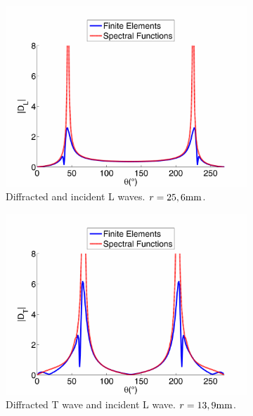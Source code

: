 \begin{figure}%
\centering
    \begin{subfigure}[b]{0.44\textwidth}
        \includegraphics[width=\textwidth]{images/chapter3/Figure11a.pdf}
        \caption{Diffracted and incident L waves. $r=25,6 \rm mm$.}
        \label{DLL}
    \end{subfigure}  
    \begin{subfigure}[b]{0.44\textwidth}
        \includegraphics[width=\textwidth]{images/chapter3/Figure11b.pdf}
        \caption{Diffracted T wave and incident L wave. $r=13,9 \rm mm$.}
        \label{DLT}
     \end{subfigure}   
     \begin{subfigure}[b]{0.44\textwidth}

\end{subfigure}
\end{figure}
